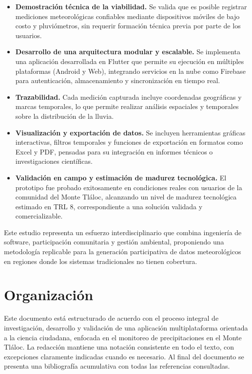 \begin{itemize}
  \item \textbf{Demostración técnica de la viabilidad.} Se valida que es posible registrar mediciones meteorológicas confiables mediante dispositivos móviles de bajo costo y pluviómetros, sin requerir formación técnica previa por parte de los usuarios.
  
  \item \textbf{Desarrollo de una arquitectura modular y escalable.} Se implementa una aplicación desarrollada en Flutter que permite su ejecución en múltiples plataformas (Android y Web), integrando servicios en la nube como Firebase para autenticación, almacenamiento y sincronización en tiempo real.
  
  \item \textbf{Trazabilidad.} Cada medición capturada incluye coordenadas geográficas y marcas temporales, lo que permite realizar análisis espaciales y temporales sobre la distribución de la lluvia.
  
  \item \textbf{Visualización y exportación de datos.} Se incluyen herramientas gráficas interactivas, filtros temporales y funciones de exportación en formatos como Excel y PDF, pensadas para su integración en informes técnicos o investigaciones científicas.
  
  \item \textbf{Validación en campo y estimación de madurez tecnológica.} El prototipo fue probado exitosamente en condiciones reales con usuarios de la comunidad del Monte Tláloc, alcanzando un nivel de madurez tecnológica estimado en TRL 8, correspondiente a una solución validada y comercializable.
\end{itemize}

Este estudio representa un esfuerzo interdisciplinario que combina ingeniería de software, participación comunitaria y gestión ambiental, proponiendo una metodología replicable para la generación participativa de datos meteorológicos en regiones donde los sistemas tradicionales no tienen cobertura.




\section{Organización}

Este documento está estructurado de acuerdo con el proceso integral de investigación, desarrollo y validación de una aplicación multiplataforma orientada a la ciencia ciudadana, enfocada en el monitoreo de precipitaciones en el Monte Tláloc. La redacción mantiene una notación consistente en todo el texto, con excepciones claramente indicadas cuando es necesario. Al final del documento se presenta una bibliografía acumulativa con todas las referencias consultadas.

